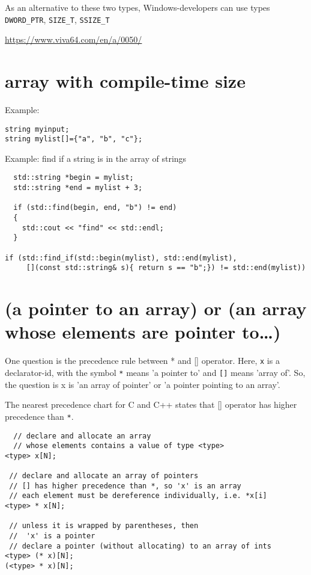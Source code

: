 As an alternative to these two types, Windows-developers can use types 
\verb!DWORD_PTR!, \verb!SIZE_T!, \verb!SSIZE_T!

\url{https://www.viva64.com/en/a/0050/}




\section{array with compile-time size}
\label{sec:array-fixed-size-intrinsic}

Example:
\begin{verbatim}
string myinput;
string mylist[]={"a", "b", "c"};
\end{verbatim}


Example: find if a string is in the array of strings
\begin{lstlisting}
  std::string *begin = mylist;
  std::string *end = mylist + 3;

  if (std::find(begin, end, "b") != end)
  {
    std::cout << "find" << std::endl;
  }

if (std::find_if(std::begin(mylist), std::end(mylist),
     [](const std::string& s){ return s == "b";}) != std::end(mylist))
\end{lstlisting}

\section{(a pointer to an array) or (an array whose elements are
pointer to\ldots) }
\label{sec:pointer-to-an-array}
\label{sec:array-whose-elements-are-pointers}

One question is the precedence rule between * and [] operator.
Here, \verb!x! is a declarator-id, with the symbol \verb!*! means 'a pointer to'
and \verb![]! means 'array of'. So, the question is x is 'an array of pointer'
or 'a pointer pointing to an array'. 

The nearest precedence chart for C and C++ states that [] operator has higher
precedence than \verb!*!. 

\begin{verbatim}
  // declare and allocate an array 
  // whose elements contains a value of type <type>
<type> x[N];

 // declare and allocate an array of pointers
 // [] has higher precedence than *, so 'x' is an array  
 // each element must be dereference individually, i.e. *x[i]
<type> * x[N];

 // unless it is wrapped by parentheses, then 
 //  'x' is a pointer
 // declare a pointer (without allocating) to an array of ints
<type> (* x)[N];
(<type> * x)[N];

\end{verbatim}

